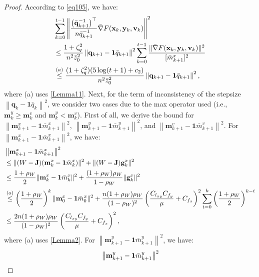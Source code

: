 \documentclass{article}
\theoremstyle{plain}
\theoremstyle{definition}
\theoremstyle{remark}
\begin{document}
\begin{proof}
According to \cref{eq105}, we have:
\begin{align}
&\sum_{k=0}^{t-1} 
\left\|\frac{\big(\tilde{\mathbf{q}}_{k+1}^{-1}\big)^\top}{n\bar{q}_{k+1}^{-1}} \bar{\nabla} F(\mathbf{x}_k, \mathbf{y}_k, \mathbf{v}_k)
\right\|^2 \notag\\
&\leq\frac{1+\zeta_q^2}{n^2\bar{z}_0^2}\left\| \mathbf{q}_{k+1}-\mathbf{1}\bar{q}_{k+1}\right\|^2 \sum_{k=0}^{t-1}\frac{\| \bar{\nabla} F(\mathbf{x}_{k}, \mathbf{y}_{k}, \mathbf{v}_{k}) \|^2}{[\bar{m}^x_{k+1}]^2}\notag \\
&\overset{(a)}{\leq}\frac{(1+\zeta_q^2)(5 \log(t + 1) + c_2)}{n^2\bar{z}_0^2}\left\| \mathbf{q}_{k+1}-\mathbf{1}\bar{q}_{k+1}\right\|^2,\label{eq114}
\end{align}
where (a) uses \cref{Lemma11}.
Next, for the term of inconsistency of the stepsize $\left\| \mathbf{q}_{k}-\mathbf{1}\bar{q}_{k}\right\|^2$, we consider two cases due to the max operator used ({i.e.,} $\mathbf{m}_k^y \geq \mathbf{m}_k^v$ and $\mathbf{m}_k^y < \mathbf{m}_k^v$). First of all, we derive the bound for $\left\| \mathbf{m}_{k+1}^x-\mathbf{1}\bar{m}_{k+1}^x\right\|^2$, $\left\| \mathbf{m}_{k+1}^y-\mathbf{1}\bar{m}_{k+1}^y\right\|^2$, and $\left\| \mathbf{m}_{k+1}^v-\mathbf{1}\bar{m}_{k+1}^v\right\|^2$. For $\left\| \mathbf{m}_{k+1}^x-\mathbf{1}\bar{m}_{k+1}^x\right\|^2$, we have:
\begin{align}
&\left\| \mathbf{m}_{k+1}^x-\mathbf{1}\bar{m}_{k+1}^x\right\|^2\notag\\
&\leq\| (W - \mathbf{J}) ( \mathbf{m}_{k}^x-\mathbf{1}\bar{m}_{k}^x)\|^2 + \|(W - \mathbf{J}) \mathbf{g}_k^x \|^2  \notag \\
&\leq \frac{1 + \rho_W}{2} 
\| \mathbf{m}_k^x - \mathbf{1}\bar{m}_k^x \|^2 
+ \frac{(1 + \rho_W) \rho_W}{1 - \rho_W} \| \mathbf{g}_k^x \|^2 \notag \\
&\overset{(a)}{\leq} 
\left( \frac{1 + \rho_W}{2} \right)^k 
\| \mathbf{m}_0^x - \mathbf{1}\bar{m}_0^x \|^2 
+ \frac{n (1 + \rho_W) \rho_W}{(1 - \rho_W)^2}\left(\frac{C_{l_{xy}}C_{f_y}}{\mu}+C_{f_x}\right)^2 
\sum_{t=0}^k 
\left( \frac{1 + \rho_W}{2} \right)^{k-t} \notag \\
&\leq \frac{2n (1 + \rho_W) \rho_W}{(1 - \rho_W)^2}\left(\frac{C_{l_{xy}}C_{f_y}}{\mu}+C_{f_x}\right)^2,\label{eq115}
\end{align}
where (a) uses \cref{Lemma2}. For $\left\| \mathbf{m}_{k+1}^y-\mathbf{1}\bar{m}_{k+1}^y\right\|^2$, we have:
\begin{align}
&\left\| \mathbf{m}_{k+1}^y-\mathbf{1}\bar{m}_{k+1}^y\right\|^2\notag\\

\end{align}
\end{proof}
\end{document}

